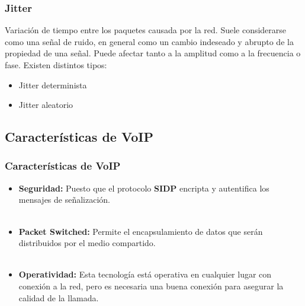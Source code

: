 \documentclass{beamer}
\begin{document}
	\begin{frame}
	\frametitle{Jitter}
		Variación de tiempo entre los paquetes causada por la red. Suele considerarse como una señal de ruido, en general como un cambio indeseado y abrupto de la propiedad de una señal. Puede afectar tanto a la amplitud como a la frecuencia o fase.
		Existen distintos tipos:
		\begin{itemize}
			\item Jitter determinista
			\item Jitter aleatorio
			\end{itemize}
	\end{frame}
	
	\subsection{Características de VoIP}
	\begin{frame}
	\frametitle{Características de VoIP}
		\begin{itemize}
			\item \textbf{Seguridad:} Puesto que el protocolo \textbf{SIDP} encripta y autentifica los mensajes de señalización.\\~\\
			\item \textbf{Packet Switched:} Permite el encapsulamiento de datos que serán distribuidos por el medio compartido.\\~\\
			\item \textbf{Operatividad:} Esta tecnología está operativa en cualquier lugar con conexión a la red, pero es necesaria una buena conexión para asegurar la calidad de la llamada.
		\end{itemize}
	\end{frame}

\end{document}
